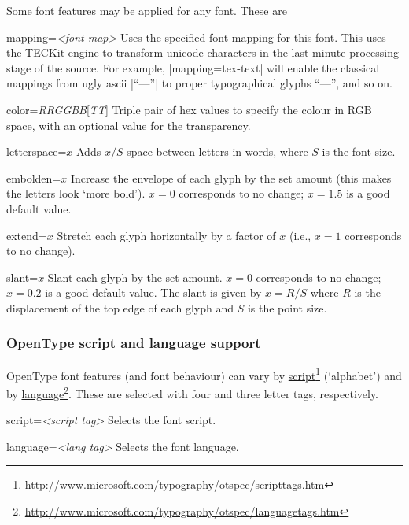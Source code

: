 \documentclass[12pt]{article}
\newenvironment{optdesc}
  {\begin{description}[font=\ttfamily,style=nextline,leftmargin=1.5cm]}
  {\end{description}}
\newcommand\hlink[2]{\href{#1}{#2}\footnote{\url{#1}}}
\begin{document}
Some font features may be applied for any font. These are
\begin{optdesc}
\item[mapping=\textsl{<font map>}] 
Uses the specified font mapping for this font. This uses the TECKit
engine to transform unicode characters in the last-minute processing
stage of the source. For example, |mapping=tex-text| will enable the
classical mappings from ugly ascii |``---''| to proper typographical
glyphs “—”, and so on.

\item[color={\slshape RRGGBB}{[{\slshape TT}]}] 
Triple pair of hex values to specify the colour in RGB space, with an
optional value for the transparency.

\item[letterspace=$x$] 
Adds $x/S$ space between letters in words, where $S$ is the font size.

\item[embolden=$x$]
Increase the envelope of each glyph by the set amount (this makes the
letters look ‘more bold’). $x=0$ corresponds to no change; $x=1.5$ is a
good default value.

\item[extend=$x$]
Stretch each glyph horizontally by a factor of $x$ (i.e., $x=1$
corresponds to no change).

\item[slant=$x$]
Slant each glyph by the set amount. $x=0$ corresponds to no change;
$x=0.2$ is a good default value. The slant is given by $x=R/S$ where $R$
is the displacement of the top edge of each glyph and $S$ is the point
size.

\end{optdesc}

\subsubsection{OpenType script and language support}

OpenType font features (and font behaviour) can vary by
\hlink{http://www.microsoft.com/typography/otspec/scripttags.htm}{script}
(‘alphabet’) and by
\hlink{http://www.microsoft.com/typography/otspec/languagetags.htm}{language}.
These are selected with four and three letter tags, respectively.

\begin{optdesc}
\item[script=\textsl{<script tag>}] Selects the font script.
\item[language=\textsl{<lang tag>}] Selects the font language.
\end{optdesc}
\end{document}
